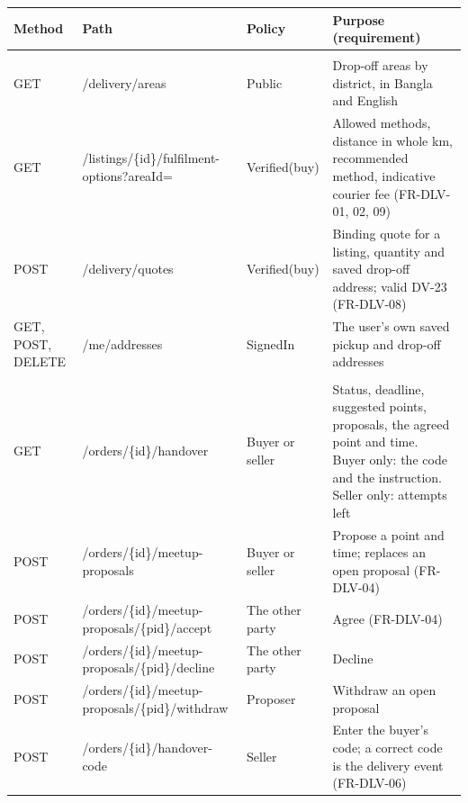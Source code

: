 \documentclass[11pt,a4paper]{article}
\begin{document}
{\small
\begin{longtable}{@{}>{\ttfamily\raggedright\arraybackslash}p{1.55cm}>{\ttfamily\raggedright\arraybackslash}p{4.7cm}>{\raggedright\arraybackslash}p{2.5cm}>{\raggedright\arraybackslash}p{6.2cm}@{}}
\toprule
\textnormal{\textbf{Method}} & \textnormal{\textbf{Path}} & \textbf{Policy} & \textbf{Purpose (requirement)} \\ \midrule \endhead
\multicolumn{4}{@{}l}{\textbf{Choosing a method and pricing}} \\
GET & /\allowbreak delivery/\allowbreak areas & Public & Drop-off areas by district, in Bangla and English \\
GET & /\allowbreak listings/\allowbreak \{id\}/\allowbreak fulfilment-\allowbreak options?\allowbreak areaId= & Verified(buy) & Allowed methods, distance in whole km, recommended method, indicative courier fee (FR-DLV-01, 02, 09) \\
POST & /\allowbreak delivery/\allowbreak quotes & Verified(buy) & Binding quote for a listing, quantity and saved drop-off address; valid DV-23 (FR-DLV-08) \\
GET, POST, DELETE & /\allowbreak me/\allowbreak addresses & SignedIn & The user's own saved pickup and drop-off addresses \\
\multicolumn{4}{@{}l}{\textbf{Meetup handover}} \\
GET & /\allowbreak orders/\allowbreak \{id\}/\allowbreak handover & Buyer or seller & Status, deadline, suggested points, proposals, the agreed point and time. Buyer only: the code and the instruction. Seller only: attempts left \\
POST & /\allowbreak orders/\allowbreak \{id\}/\allowbreak meetup-\allowbreak proposals & Buyer or seller & Propose a point and time; replaces an open proposal (FR-DLV-04) \\
POST & /\allowbreak orders/\allowbreak \{id\}/\allowbreak meetup-\allowbreak proposals/\allowbreak \{pid\}/\allowbreak accept & The other party & Agree (FR-DLV-04) \\
POST & /\allowbreak orders/\allowbreak \{id\}/\allowbreak meetup-\allowbreak proposals/\allowbreak \{pid\}/\allowbreak decline & The other party & Decline \\
POST & /\allowbreak orders/\allowbreak \{id\}/\allowbreak meetup-\allowbreak proposals/\allowbreak \{pid\}/\allowbreak withdraw & Proposer & Withdraw an open proposal \\
POST & /\allowbreak orders/\allowbreak \{id\}/\allowbreak handover-\allowbreak code & Seller & Enter the buyer's code; a correct code is the delivery event (FR-DLV-06) \\

\end{longtable}}
\end{document}
